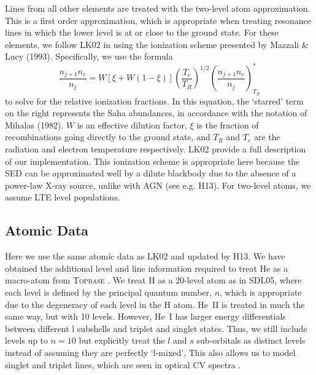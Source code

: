 \documentclass[preprint, a4paper, 11pt]{aastex}
\begin{document}
Lines from all other elements are treated with the two-level atom approximation. 
This is a first order approximation, which is appropriate 
when treating resonance lines in which the lower level is at or close to the 
ground state. 
For these elements, we follow LK02 in using the ionization scheme presented by Mazzali \& Lucy (1993). 
Specifically, we use the formula
\begin{equation}
\frac{n_{j+1} n_e}{n_j} = W [\xi + W(1-\xi)]
\left(\frac{T_e}{T_R}\right)^{1/2}
\left(\frac{n_{j+1}n_e}{n_j}\right)^*_{T_R} \label{ionization}
\end{equation}
to solve for the relative ionization fractions. In this equation, the `starred' term on 
the right represents the Saha abundances, in accordance with the notation of Mihalas (1982). 
$W$ is an effective dilution factor, $\xi$ is the
fraction of recombinations going directly to the ground state, and
$T_R$ and $T_e$ are the radiation and electron temperature
respectively. LK02 provide a full description of our implementation.
This ionization scheme is appropriate here because
the SED can be approximated well by a dilute blackbody due to the 
absence of a power-law X-ray source, unlike with AGN (see e.g. H13).
For two-level atoms, we assume LTE level populations.



\subsection{Atomic Data}
Here we use the same atomic data as LK02 and updated by H13.
We have obtained the additional level and line information required to treat He as a macro-atom 
from \textsc{Topbase} \citep{topbase2005}. We treat H as a 20-level atom as in SDL05, where 
each level is defined by the principal quantum number, $n$, which is appropriate due to
the degeneracy of each level in the H atom. He~\textsc{II} is treated in much the same way,
but with 10 levels. However, He~\textsc{I} has larger energy differentials between different l subshells
and triplet and singlet states. Thus, we still include levels up to $n=10$ but explicitly 
treat the $l$ and $s$ sub-orbitals as distinct levels instead of assuming they are perfectly `l-mixed',
This also allows us to model singlet and 
triplet lines, which are seen in optical CV spectra \citep[e.g.][]{dhillon1996}.
\end{document}
